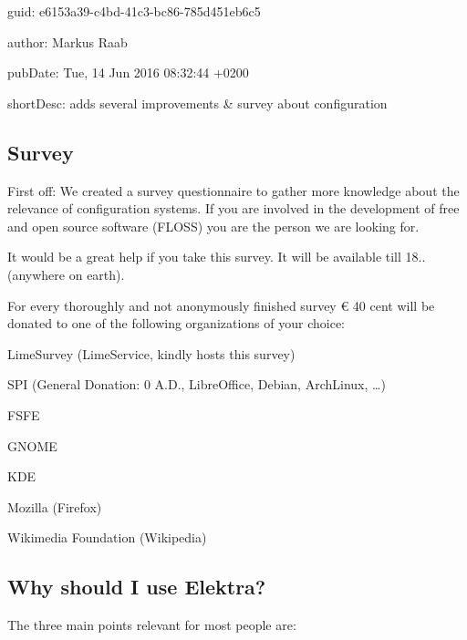 
\begin{DoxyItemize}
\item guid\+: e6153a39-\/c4bd-\/41c3-\/bc86-\/785d451eb6c5
\item author\+: Markus Raab
\item pub\+Date\+: Tue, 14 Jun 2016 08\+:32\+:44 +0200
\item short\+Desc\+: adds several improvements \& survey about configuration
\end{DoxyItemize}

\subsection*{Survey}

First off\+: We created a survey questionnaire to gather more knowledge about the relevance of configuration systems. If you are involved in the development of free and open source software (F\+L\+O\+SS) you are the person we are looking for.

It would be a great help if you take this survey. It will be available till 18.. (anywhere on earth).

For every thoroughly and not anonymously finished survey € 40 cent will be donated to one of the following organizations of your choice\+:


\begin{DoxyItemize}
\item Lime\+Survey (Lime\+Service, kindly hosts this survey)
\item S\+PI (General Donation\+: 0 A.\+D., Libre\+Office, Debian, Arch\+Linux, …)
\item F\+S\+FE
\item G\+N\+O\+ME
\item K\+DE
\item Mozilla (Firefox)
\item Wikimedia Foundation (Wikipedia)
\end{DoxyItemize}

\subsection*{Why should I use Elektra?}

The three main points relevant for most people are\+:


